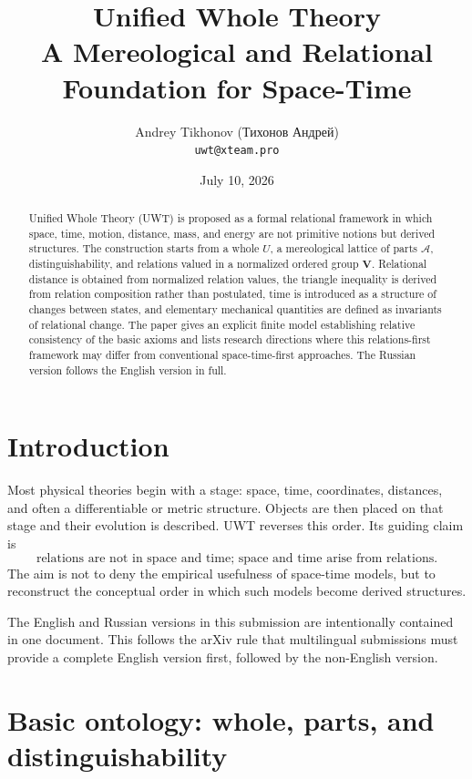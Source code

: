 \documentclass[11pt,a4paper]{article}
\title{\textbf{Unified Whole Theory}\\
\large A Mereological and Relational Foundation for Space-Time}
\author{Andrey Tikhonov (Тихонов Андрей)\\\texttt{uwt@xteam.pro}}
\date{July 10, 2026}
\theoremstyle{definition}
\theoremstyle{plain}
\theoremstyle{remark}
\newcommand{\Whole}{U}
\newcommand{\Parts}{\mathcal A}
\newcommand{\Vstruct}{\mathbf V}
\begin{document}
\maketitle

\begin{abstract}
Unified Whole Theory (UWT) is proposed as a formal relational framework in which
space, time, motion, distance, mass, and energy are not primitive notions but
derived structures. The construction starts from a whole \(\Whole\), a
mereological lattice of parts \(\Parts\), distinguishability, and relations
valued in a normalized ordered group \(\Vstruct\). Relational distance is
obtained from normalized relation values, the triangle inequality is derived
from relation composition rather than postulated, time is introduced as a
structure of changes between states, and elementary mechanical quantities are
defined as invariants of relational change. The paper gives an explicit finite
model establishing relative consistency of the basic axioms and lists research
directions where this relations-first framework may differ from conventional
space-time-first approaches. The Russian version follows the English version in
full.
\end{abstract}

\tableofcontents

\section{Introduction}

Most physical theories begin with a stage: space, time, coordinates, distances,
and often a differentiable or metric structure. Objects are then placed on that
stage and their evolution is described. UWT reverses this order. Its guiding
claim is
\[
\boxed{\text{relations are not in space and time; space and time arise from relations.}}
\]
The aim is not to deny the empirical usefulness of space-time models, but to
reconstruct the conceptual order in which such models become derived structures.

The English and Russian versions in this submission are intentionally contained
in one document. This follows the arXiv rule that multilingual submissions must
provide a complete English version first, followed by the non-English version.

\section{Basic ontology: whole, parts, and distinguishability}
\end{document}
